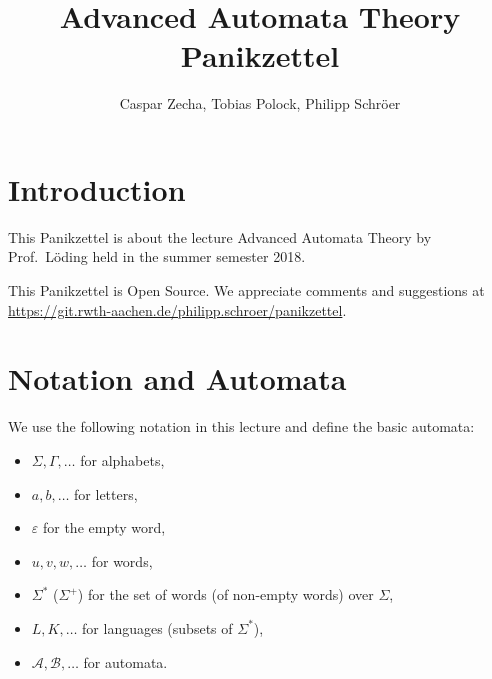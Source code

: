 \documentclass[english]{panikzettel}
\title{Advanced Automata Theory Panikzettel}
\author{Caspar Zecha, Tobias Polock, Philipp Schröer}
\begin{document}
\maketitle

\tableofcontents

\section{Introduction}

This Panikzettel is about the lecture Advanced Automata Theory by Prof.\ Löding held in the summer semester 2018.

This Panikzettel is Open Source. We appreciate comments and suggestions at \\ \url{https://git.rwth-aachen.de/philipp.schroer/panikzettel}.

\section{Notation and Automata}
We use the following notation in this lecture and define the basic automata:

\begin{halfboxl}
    \vspace{-\baselineskip}
    \begin{itemize}
        \item $\Sigma,\Gamma,\dots$ for alphabets,
        \item $a,b,\dots$ for letters,
        \item $\varepsilon$ for the empty word,
        \item $u,v,w,\dots$ for words,
    \end{itemize}
\end{halfboxl}%
\begin{halfboxr}
    \vspace{-\baselineskip}
    \begin{itemize}
        \item $\Sigma^*$ ($\Sigma^+$) for the set of words (of non-empty words) over $\Sigma$,
        \item $L,K,\dots$ for languages (subsets of $\Sigma^*$),
        \item $\mathcal{A},\mathcal{B},\dots$ for automata.
    \end{itemize}
\end{halfboxr}
\end{document}
